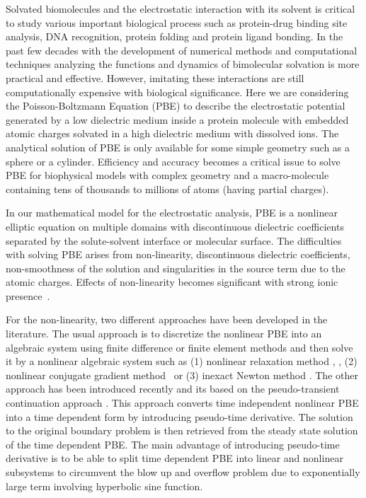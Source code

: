Solvated biomolecules and the electrostatic interaction with its solvent is critical to study various important biological process such as protein-drug binding site analysis, DNA recognition, protein folding and protein ligand bonding. In the past few decades with the development of numerical methods and computational techniques analyzing the functions and dynamics of bimolecular solvation is more practical and effective. However, imitating these interactions are still computationally expensive with biological significance. Here we are considering the Poisson-Boltzmann Equation (PBE)  to describe the electrostatic potential generated by a low dielectric medium inside a protein molecule with embedded atomic charges solvated in a high dielectric medium with dissolved ions. The analytical solution of PBE is only available for some simple geometry such as a sphere or a cylinder. Efficiency and accuracy becomes a critical issue to solve PBE for biophysical models with complex geometry and a macro-molecule containing tens of thousands to millions of atoms (having partial charges). 

 In our mathematical model for the electrostatic analysis, PBE is a nonlinear elliptic equation on multiple domains with discontinuous dielectric coefficients separated  by the solute-solvent interface or molecular surface. The difficulties with solving PBE arises from non-linearity, discontinuous dielectric coefficients, non-smoothness of the solution and singularities in the source term due to the atomic charges. Effects of non-linearity becomes significant with strong ionic presence~\cite{Wilson2016}. 


For the non-linearity, two different approaches have been developed in the literature. The usual approach is to discretize the nonlinear PBE into an algebraic system using finite difference or finite element methods and then solve it by a nonlinear algebraic system such as (1) nonlinear relaxation method \cite{Im1998}, \cite{Rocchia2001}, (2) nonlinear conjugate gradient method~\cite{Luty1992} or (3) inexact Newton method \cite{Holst1995}. The other approach has been introduced recently and its based on the  pseudo-transient continuation approach \cite{Shestakov2002,Sayyed-Ahmad2004,Zhao2011}. This approach converts time independent nonlinear PBE into a time dependent form by introducing pseudo-time derivative. The solution to the original boundary problem is then retrieved from the steady state solution of the time dependent PBE. The main advantage of introducing pseudo-time derivative is to be able to split time dependent PBE into linear and nonlinear subsystems to circumvent the blow up and overflow problem due to exponentially large term involving hyperbolic sine function. 

